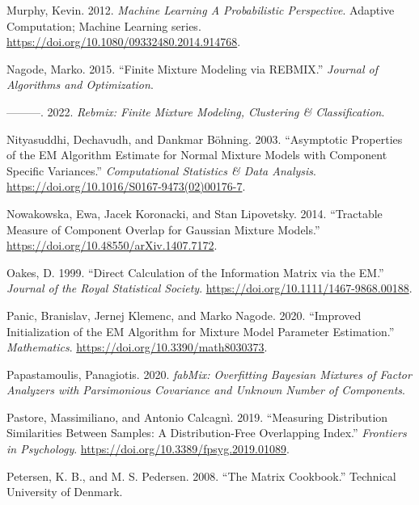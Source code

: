 \begin{CSLReferences}{1}{0}
\leavevmode{}%
Murphy, Kevin. 2012. \emph{Machine {Learning A Probabilistic Perspective}}. Adaptive Computation; Machine Learning series. \url{https://doi.org/10.1080/09332480.2014.914768}.

\leavevmode{}%
Nagode, Marko. 2015. {``Finite Mixture Modeling via REBMIX.''} \emph{Journal of Algorithms and Optimization}.

\leavevmode{}%
---------. 2022. \emph{Rebmix: Finite Mixture Modeling, Clustering \& Classification}.

\leavevmode{}%
Nityasuddhi, Dechavudh, and Dankmar Böhning. 2003. {``Asymptotic Properties of the {EM} Algorithm Estimate for Normal Mixture Models with Component Specific Variances.''} \emph{Computational Statistics \& Data Analysis}. \url{https://doi.org/10.1016/S0167-9473(02)00176-7}.

\leavevmode{}%
Nowakowska, Ewa, Jacek Koronacki, and Stan Lipovetsky. 2014. {``Tractable {Measure} of {Component Overlap} for {Gaussian Mixture Models}.''} \url{https://doi.org/10.48550/arXiv.1407.7172}.

\leavevmode{}%
Oakes, D. 1999. {``Direct Calculation of the Information Matrix via the {EM}.''} \emph{Journal of the Royal Statistical Society}. \url{https://doi.org/10.1111/1467-9868.00188}.

\leavevmode{}%
Panic, Branislav, Jernej Klemenc, and Marko Nagode. 2020. {``Improved Initialization of the EM Algorithm for Mixture Model Parameter Estimation.''} \emph{Mathematics}. \url{https://doi.org/10.3390/math8030373}.

\leavevmode{}%
Papastamoulis, Panagiotis. 2020. \emph{fabMix: Overfitting Bayesian Mixtures of Factor Analyzers with Parsimonious Covariance and Unknown Number of Components}.

\leavevmode{}%
Pastore, Massimiliano, and Antonio Calcagnì. 2019. {``Measuring {Distribution Similarities Between Samples}: {A Distribution-Free Overlapping Index}.''} \emph{Frontiers in Psychology}. \url{https://doi.org/10.3389/fpsyg.2019.01089}.

\leavevmode{}%
Petersen, K. B., and M. S. Pedersen. 2008. {``The Matrix Cookbook.''} Technical University of Denmark.


\end{CSLReferences}
